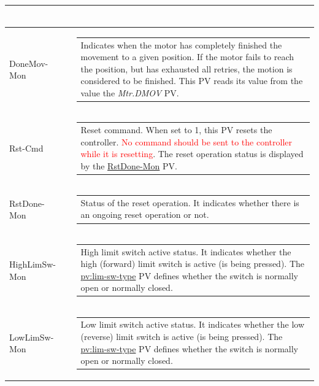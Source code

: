 \documentclass[openany]{article}
\begin{document}
\begin{longtable}{| m{4.5cm} m{2.5cm}  m{8.5cm} |}
\begin{tabular}{@{}m{6cm}@{}}
            \end{tabular} \hypertarget{pv:done-mov-mon}{}\\ \hline
        DoneMov-Mon &  & \begin{tabular}{@{}m{6cm}@{}}
                Indicates when the motor has completely finished the movement to a given position. If the motor fails to reach the position, but has exhausted all retries, the motion is considered to be finished. This PV reads its value from the value the \emph{Mtr.DMOV} PV.
            \end{tabular} \hypertarget{pv:rst-cmd}{}\\ \hline
        Rst-Cmd &  & \begin{tabular}{@{}m{6cm}@{}}
                Reset command. When set to 1, this PV resets the controller. \textcolor{red}{No command should be sent to the controller while it is resetting}. The reset operation status is displayed by the \hyperlink{pv:rst-done-mon}{RstDone-Mon} PV.
            \end{tabular} \hypertarget{pv:rst-done-mon}{}\\ \hline
        RstDone-Mon &  & \begin{tabular}{@{}m{6cm}@{}}
                Status of the reset operation. It indicates whether there is an ongoing reset operation or not.
            \end{tabular} \hypertarget{pv:high-lim-sw-mon}{}\\ \hline
        HighLimSw-Mon &  & \begin{tabular}{@{}m{6cm}@{}}
                High limit switch active status. It indicates whether the high (forward) limit switch is active (is being pressed). The \hyperlink{limit switch type}{pv:lim-sw-type} PV defines whether the switch is normally open or normally closed.
            \end{tabular} \hypertarget{pv:low-lim-sw-mon}{}\\ \hline
        LowLimSw-Mon &  & \begin{tabular}{@{}m{6cm}@{}}
                Low limit switch active status. It indicates whether the low (reverse) limit switch is active (is being pressed). The \hyperlink{limit switch type}{pv:lim-sw-type} PV defines whether the switch is normally open or normally closed.
            \end{tabular} \hypertarget{pv:enc-pos-mon}{}\\ \hline

\end{longtable}
\end{document}
